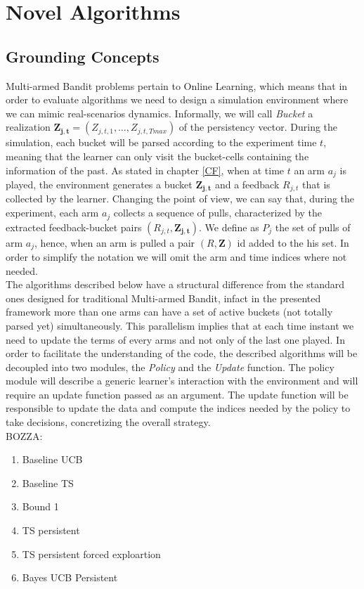 \chapter{Novel Algorithms}\label{C10}




\section{Grounding Concepts}
Multi-armed Bandit problems pertain to Online Learning, which means that in order to evaluate algorithms we need to design a simulation environment where we can mimic real-scenarios dynamics. Informally, we will call \emph{Bucket} a realization $\boldsymbol{Z_{j,t}}= (Z_{j,t,1},\dots, Z_{j,t,Tmax})$ of the persistency vector. During the simulation, each bucket will be parsed according to the experiment time $t$, meaning that the learner can only visit the bucket-cells containing the information of the past. As stated in chapter \ref{CF}, when at time $t$ an arm $a_j$ is played, the environment generates a bucket $\boldsymbol{Z_{j,t}}$ and a feedback $R_{j,t}$ that is collected by the learner.
Changing the point of view, we can say that, during the experiment, each arm $a_j$ collects a sequence of pulls, characterized by the extracted feedback-bucket pairs $(R_ {j, t}, \boldsymbol{Z_ {j, t}})$. We define as $P_j$ the set of pulls of arm $a_j$, hence, when an arm is pulled a pair $(R, \boldsymbol{Z})$ id added to the his set. In order to simplify the notation we will omit the arm and time indices where not needed.\\
The algorithms described below have a structural difference from the standard ones designed for traditional Multi-armed Bandit, infact in the presented framework more than one arms can have a set of active buckets (not totally parsed yet) simultaneously.  This parallelism implies that at each time instant we need to update the terms of every arms and not only of the last one played. In order to facilitate the understanding of the code, the described algorithms will be decoupled into two modules, the \emph{Policy} and the \emph{Update} function. The policy module will describe a generic learner's interaction with the environment and will require an update function passed as an argument. The update function will be responsible to update the data and compute the indices needed by the policy to take decisions, concretizing the overall strategy.\\BOZZA:
\begin{enumerate}
	
	\item Baseline UCB 
	\item Baseline TS
	\item Bound 1
	\item TS persistent 
	\item TS persistent forced exploartion
	\item Bayes UCB Persistent
	
	
\end{enumerate}


